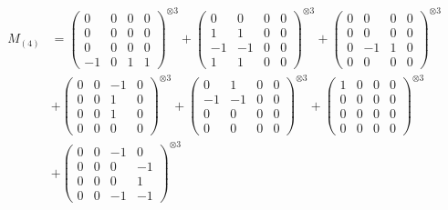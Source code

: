\documentclass{article}
\newcommand{\Mthree}{%
    M_{(4)}
}
\begin{document}
        \newpage
        
        \footnotesize{
        \begin{align}
        \Mthree
        &= \label{Rs16-Rc11-Solution-18-c1} \begin{pmatrix} 0 & 0 & 0 & 0 \\ 0 & 0 & 0 & 0 \\ 0 & 0 & 0 & 0 \\ -1 & 0 & 1 & 1 \end{pmatrix}^{\otimes 3} 
            + \begin{pmatrix} 0 & 0 & 0 & 0 \\ 1 & 1 & 0 & 0 \\ -1 & -1 & 0 & 0 \\ 1 & 1 & 0 & 0 \end{pmatrix}^{\otimes 3} 
            + \begin{pmatrix} 0 & 0 & 0 & 0 \\ 0 & 0 & 0 & 0 \\ 0 & -1 & 1 & 0 \\ 0 & 0 & 0 & 0 \end{pmatrix}^{\otimes 3} \\
        &+ \label{Rs16-Rc11-Solution-18-c4} \begin{pmatrix} 0 & 0 & -1 & 0 \\ 0 & 0 & 1 & 0 \\ 0 & 0 & 1 & 0 \\ 0 & 0 & 0 & 0 \end{pmatrix}^{\otimes 3} 
            + \begin{pmatrix} 0 & 1 & 0 & 0 \\ -1 & -1 & 0 & 0 \\ 0 & 0 & 0 & 0 \\ 0 & 0 & 0 & 0 \end{pmatrix}^{\otimes 3} 
            + \begin{pmatrix} 1 & 0 & 0 & 0 \\ 0 & 0 & 0 & 0 \\ 0 & 0 & 0 & 0 \\ 0 & 0 & 0 & 0 \end{pmatrix}^{\otimes 3} \\
        &+ \label{Rs16-Rc11-Solution-18-c7} \begin{pmatrix} 0 & 0 & -1 & 0 \\ 0 & 0 & 0 & -1 \\ 0 & 0 & 0 & 1 \\ 0 & 0 & -1 & -1 \end{pmatrix}^{\otimes 3} 

\end{align}}
\end{document}
